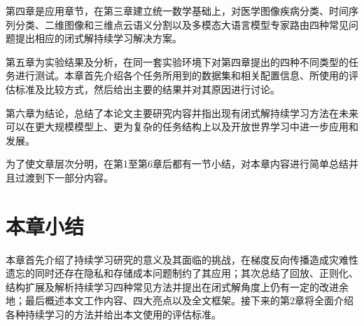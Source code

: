 第四章是应用章节，在第三章建立统一数学基础上，对医学图像疾病分类、时间序列分类、二维图像和三维点云语义分割以及多模态大语言模型专家路由四种常见问题提出相应的闭式解持续学习解决方案。

第五章为实验结果及分析，在同一套实验环境下对第四章提出的四种不同类型的任务进行测试。本章首先介绍各个任务所用到的数据集和相关配置信息、所使用的评估标准及比较方式，然后给出主要的结果并对其原因进行讨论。

第六章为结论，总结了本论文主要研究内容并指出现有闭式解持续学习方法在未来可以在更大规模模型上、更为复杂的任务结构上以及开放世界学习中进一步应用和发展。

为了使文章层次分明，在第1至第6章后都有一节小结，对本章内容进行简单总结并且过渡到下一部分内容。

\section{本章小结}

本章首先介绍了持续学习研究的意义及其面临的挑战，在梯度反向传播造成灾难性遗忘的同时还存在隐私和存储成本问题制约了其应用；其次总结了回放、正则化、结构扩展及解析持续学习四种常见方法并提出在闭式解角度上仍有一定的改进余地；最后概述本文工作内容、四大亮点以及全文框架。接下来的第2章将全面介绍各种持续学习的方法并给出本文使用的评估标准。

